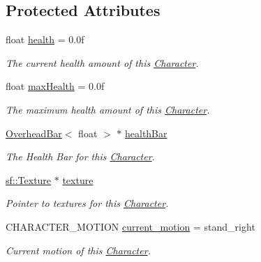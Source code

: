 \subsection*{Protected Attributes}
\begin{DoxyCompactItemize}
\item 
\mbox{\label{class_character_afb656d9f04bf30095c37cc54749f046e}} 
float \mbox{\hyperlink{class_character_afb656d9f04bf30095c37cc54749f046e}{health}} = 0.\+0f
\begin{DoxyCompactList}\small\item\em The current health amount of this \mbox{\hyperlink{class_character}{Character}}. \end{DoxyCompactList}\item 
\mbox{\label{class_character_a7abef33cbbbc2539fbcbe18c889c3cc4}} 
float \mbox{\hyperlink{class_character_a7abef33cbbbc2539fbcbe18c889c3cc4}{max\+Health}} = 0.\+0f
\begin{DoxyCompactList}\small\item\em The maximum health amount of this \mbox{\hyperlink{class_character}{Character}}. \end{DoxyCompactList}\item 
\mbox{\label{class_character_aaa179987ed6c36bc2970b421c88180bf}} 
\mbox{\hyperlink{class_overhead_bar}{Overhead\+Bar}}$<$ float $>$ $\ast$ \mbox{\hyperlink{class_character_aaa179987ed6c36bc2970b421c88180bf}{health\+Bar}}
\begin{DoxyCompactList}\small\item\em The Health Bar for this \mbox{\hyperlink{class_character}{Character}}. \end{DoxyCompactList}\item 
\mbox{\label{class_character_a0c81992cbca606ccd5f8c04be165438c}} 
\mbox{\hyperlink{classsf_1_1_texture}{sf\+::\+Texture}} $\ast$ \mbox{\hyperlink{class_character_a0c81992cbca606ccd5f8c04be165438c}{texture}}
\begin{DoxyCompactList}\small\item\em Pointer to textures for this \mbox{\hyperlink{class_character}{Character}}. \end{DoxyCompactList}\item 
\mbox{\label{class_character_a7f092c37c189cece3631ed8924af4c30}} 
C\+H\+A\+R\+A\+C\+T\+E\+R\+\_\+\+M\+O\+T\+I\+ON \mbox{\hyperlink{class_character_a7f092c37c189cece3631ed8924af4c30}{current\+\_\+motion}} = stand\+\_\+right
\begin{DoxyCompactList}\small\item\em Current motion of this \mbox{\hyperlink{class_character}{Character}}. \end{DoxyCompactList}\end{DoxyCompactItemize}
